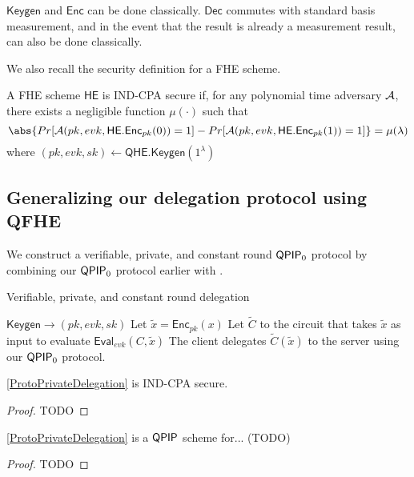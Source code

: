 $\mathsf{Keygen}$ and $\mathsf{Enc}$ can be done classically. $\mathsf{Dec}$ commutes with standard basis measurement, and in the event that the result is already a measurement result, can also be done classically.

We also recall the security definition for a FHE scheme.

\begin{dfn}
	A FHE scheme $\mathsf{HE}$ is IND-CPA secure if, for any polynomial time adversary $\mathcal{A}$, there exists a negligible function $\mu(\cdot)$ such that
	$$\abs{Pr[\cA(pk, evk, \mathsf{HE.Enc}_{pk}(0))=1]-Pr[\cA(pk, evk, \mathsf{HE.Enc}_{pk}(1))=1]}=\mu(\lambda)$$
	where $(pk, evk, sk)\leftarrow\mathsf{QHE.Keygen}(1^\lambda)$
\end{dfn}

\subsection{Generalizing our delegation protocol using QFHE}

We construct a verifiable, private, and constant round $\operatorname{\mathsf{QPIP}}_0$ protocol by combining our $\operatorname{\mathsf{QPIP}}_0$ protocol earlier with \cite{mahadev_qfhe}.

\begin{algorithm}
	\caption{Verifiable, private, and constant round delegation}
	\label{ProtoPrivateDelegation}
	\begin{algorithmic}[1]
			\State $\mathsf{Keygen}\rightarrow(pk, evk, sk)$
			\State Let $\tilde{x}=\mathsf{Enc}_{pk}(x)$
			\State Let $\tilde{C}$ to the circuit that takes $\tilde{x}$ as input to evaluate $\mathsf{Eval}_{evk}(C, \tilde{x})$
			\State The client delegates $\tilde{C}(\tilde{x})$ to the server using our $\operatorname{\mathsf{QPIP}}_0$ protocol.
		\EndProcedure
	\end{algorithmic}
\end{algorithm}

\begin{thm}
	\autoref{ProtoPrivateDelegation} is IND-CPA secure.
\end{thm}
\begin{proof}
	TODO
\end{proof}

\begin{thm}
	\autoref{ProtoPrivateDelegation} is a $\operatorname{\mathsf{QPIP}}$ scheme for... (TODO) 
\end{thm}
\begin{proof}
	TODO
\end{proof}
